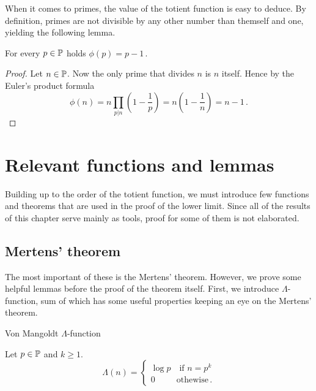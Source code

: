 \documentclass{article}
\begin{document}
When it comes to primes, the value of the totient function is easy to deduce. By definition, primes are not divisible by any other number than themself and one, yielding the following lemma.

\begin{lemma}
\label{thm:phiprime}
For every $p \in \mathbb{P}$ holds $\phi(p) = p-1$\,.

\begin{proof}

Let $n\in\mathbb{P}$. Now the only prime that divides $n$ is $n$ itself. Hence by the Euler's product formula
\begin{equation*}
    \phi(n) = n \prod_{p \vert n} \left(1 - \frac{1}{p}\right) = n\left(1-\frac{1}{n}\right) = n-1\,.
\end{equation*}

\end{proof}

\end{lemma}

\section{Relevant functions and lemmas}
\label{apujutut}

Building up to the order of the totient function, we must introduce few functions and theorems that are used in the proof of the lower limit. Since all of the results of this chapter serve mainly as tools, proof for some of them is not elaborated.

\subsection{Mertens' theorem}

The most important of these is the Mertens' theorem. However, we prove some helpful lemmas before the proof of the theorem itself. First, we introduce $\Lambda$-function, sum of which has some useful properties keeping an eye on the Mertens' theorem.

\begin{definition}
Von Mangoldt $\Lambda$-function

Let $p\in\mathbb{P}$ and $k\geq1$.
\begin{equation*}
    \Lambda(n) =
    \begin{cases}
    \log p \quad \text{if } n=p^k\\
    0 \quad\quad\,\,\, \text{othewise}\,.
    \end{cases}
\end{equation*}
\end{definition}
\end{document}
